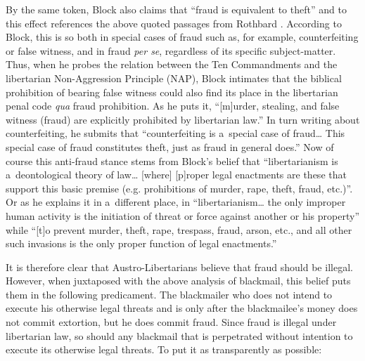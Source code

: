 {By the same token, Block 
\parencite*[][p.294]{block_libertarian_1998} %
 also claims that ``fraud is equivalent to theft'' and to this effect references the above quoted passages from Rothbard 
\parencite*[][pp.77–78]{rothbard_ethics_1998}. %
 According to Block, this is so both in special cases of fraud such as, for example, counterfeiting or false witness, and in fraud \textit{per se}, regardless of its specific subject-matter. Thus, when he 
\parencite*[][p.38]{} %
 probes the relation between the Ten Commandments and the libertarian Non-Aggression Principle (NAP), Block intimates that the biblical prohibition of bearing false witness could also find its place in the libertarian penal code \textit{qua} fraud prohibition. As he 
\parencite*[][p.38]{} %
 puts it, ``[m]urder, stealing, and false witness (fraud) are explicitly prohibited by libertarian law.'' In turn writing about counterfeiting, he 
\parencite*[][p.99]{} %
 submits that ``counterfeiting is a~special case of fraud… This special case of fraud constitutes theft, just as fraud in general does.'' Now of course this anti-fraud stance stems from Block's 
\parencite*[][p.275]{block_libertarianism_2004} %
 belief that ``libertarianism is a~deontological theory of law… [where] [p]roper legal enactments are these that support this basic premise (e.g. prohibitions of murder, rape, theft, fraud, etc.)''. Or as he 
\parencite*[][p.1889]{} %
 explains it in a~different place, in ``libertarianism… the only improper human activity is the initiation of threat or force against another or his property'' while ``[t]o prevent murder, theft, rape, trespass, fraud, arson, etc., and all other such invasions is the only proper function of legal enactments.''



It is therefore clear that Austro-Libertarians believe that fraud should be illegal. However, when juxtaposed with the above analysis of blackmail, this belief puts them in the following predicament. The blackmailer who does not intend to execute his otherwise legal threats and is only after the blackmailee's money does not commit extortion, but he does commit fraud. Since fraud is illegal under libertarian law, so should any blackmail that is perpetrated without intention to execute its otherwise legal threats. To put it as transparently as possible:



}
